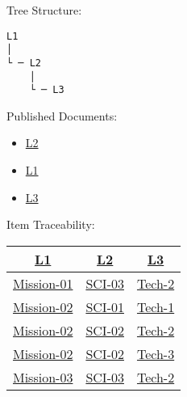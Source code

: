 \begin{frame}[fragile]{Tree Structure:}
\protect\hypertarget{tree-structure}{}

\begin{verbatim}
L1
│   
└ ─ L2
    │   
    └ ─ L3
\end{verbatim}

\end{frame}

\begin{frame}{Published Documents:}
\protect\hypertarget{published-documents}{}

\begin{itemize}
\tightlist
\item
  \href{L2.html}{L2}
\item
  \href{L1.html}{L1}
\item
  \href{L3.html}{L3}
\end{itemize}

\end{frame}

\begin{frame}{Item Traceability:}
\protect\hypertarget{item-traceability}{}

\begin{longtable}[]{@{}ccc@{}}
\toprule
\href{L1.html}{L1} & \href{L2.html}{L2} &
\href{L3.html}{L3}\tabularnewline
\midrule
\endhead
\href{L1.html\#Mission-01}{Mission-01} & \href{L2.html\#SCI-03}{SCI-03}
& \href{L3.html\#Tech-2}{Tech-2}\tabularnewline
\href{L1.html\#Mission-02}{Mission-02} & \href{L2.html\#SCI-01}{SCI-01}
& \href{L3.html\#Tech-1}{Tech-1}\tabularnewline
\href{L1.html\#Mission-02}{Mission-02} & \href{L2.html\#SCI-02}{SCI-02}
& \href{L3.html\#Tech-2}{Tech-2}\tabularnewline
\href{L1.html\#Mission-02}{Mission-02} & \href{L2.html\#SCI-02}{SCI-02}
& \href{L3.html\#Tech-3}{Tech-3}\tabularnewline
\href{L1.html\#Mission-03}{Mission-03} & \href{L2.html\#SCI-03}{SCI-03}
& \href{L3.html\#Tech-2}{Tech-2}\tabularnewline
\bottomrule
\end{longtable}

\end{frame}
